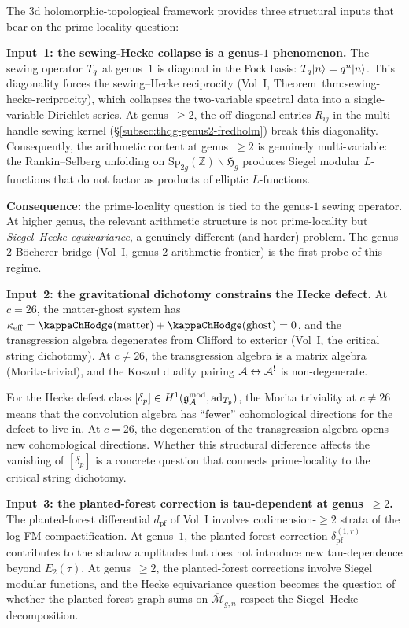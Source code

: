 \begin{remark}%
\label{rem:3d-prime-locality}%
The $3$d holomorphic-topological framework provides three
structural inputs that bear on the prime-locality question:

\textbf{Input~1: the sewing-Hecke collapse is a genus-$1$
phenomenon.}
The sewing operator $T_q$ at genus~$1$ is diagonal in the
Fock basis: $T_q|n\rangle = q^n|n\rangle$. This
diagonality forces the sewing--Hecke reciprocity
(Vol~I, Theorem~thm:sewing-hecke-reciprocity), which collapses
the two-variable spectral data into a single-variable Dirichlet
series. At genus~$\ge 2$, the off-diagonal entries $R_{ij}$
in the multi-handle sewing kernel
(\S\ref{subsec:thqg-genus2-fredholm}) break this diagonality.
Consequently, the arithmetic content at genus~$\ge 2$ is
genuinely multi-variable: the Rankin--Selberg unfolding on
$\mathrm{Sp}_{2g}(\mathbb{Z}) \backslash \mathfrak{H}_g$
produces Siegel modular $L$-functions that do not factor
as products of elliptic $L$-functions.

\textbf{Consequence:} the prime-locality question is tied to
the genus-$1$ sewing operator. At higher genus, the relevant
arithmetic structure is not prime-locality but
\emph{Siegel--Hecke equivariance}, a genuinely different (and
harder) problem. The genus-$2$ B\"ocherer bridge
(Vol~I, genus-$2$ arithmetic frontier) is the first probe
of this regime.

\textbf{Input~2: the gravitational dichotomy constrains the
Hecke defect.}
At $c = 26$, the matter-ghost system has $\kappa_{\mathrm{eff}}
= \kappaChHodge(\mathrm{matter}) + \kappaChHodge(\mathrm{ghost}) = 0$,
and the transgression algebra degenerates from Clifford to
exterior (Vol~I, the critical string dichotomy). At
$c \neq 26$, the transgression algebra is a matrix algebra
(Morita-trivial), and the Koszul duality pairing
$\mathcal{A} \leftrightarrow \mathcal{A}^!$ is non-degenerate.

For the Hecke defect class
$[\delta_p] \in H^1(\mathfrak{g}_{\mathcal{A}}^{\mathrm{mod}},
\mathrm{ad}_{T_p})$,
the Morita triviality at $c \neq 26$ means that the
convolution algebra has ``fewer'' cohomological directions
for the defect to live in. At $c = 26$, the degeneration
of the transgression algebra opens new cohomological
directions. Whether this structural difference affects the
vanishing of $[\delta_p]$ is a concrete question that
connects prime-locality to the critical string dichotomy.

\textbf{Input~3: the planted-forest correction is
tau-dependent at genus~$\ge 2$.}
The planted-forest differential $d_{\mathrm{pf}}$ of
Vol~I involves codimension-$\ge 2$ strata of the log-FM
compactification. At genus~$1$, the planted-forest
correction $\delta_{\mathrm{pf}}^{(1,r)}$ contributes to the
shadow amplitudes but does not introduce new tau-dependence
beyond $E_2(\tau)$. At genus~$\ge 2$, the planted-forest
corrections involve Siegel modular functions, and the
Hecke equivariance question becomes the question of whether
the planted-forest graph sums on $\overline{\mathcal{M}}_{g,n}$
respect the Siegel--Hecke decomposition.
\end{remark}

